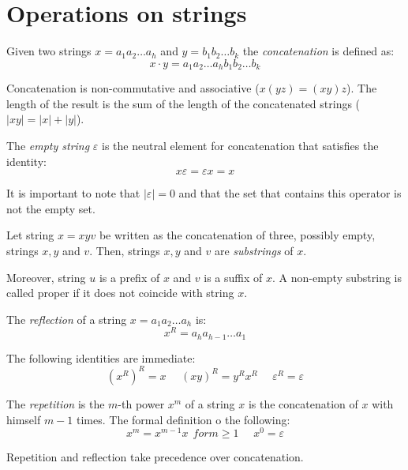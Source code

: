 \section{Operations on strings}

\begin{definition}[Concatenation]
    Given two strings $x=a_1a_2\dots a_h$ and $y=b_1b_2\dots b_k$ the \emph{concatenation} is defined as:
    \[x \cdot y = a_1a_2\dots a_h b_1b_2\dots b_k\]
\end{definition}
Concatenation is non-commutative and associative ($x(yz)=(xy)z$). The length of the result is the sum of the length of the concatenated strings
($\left\lvert xy \right\rvert = \left\lvert x \right\rvert + \left\lvert y \right\rvert$). 
\begin{definition}
    The \emph{empty string} $\varepsilon$ is the neutral element for concatenation that satisfies the identity:
    \[x\varepsilon=\varepsilon x=x\]
\end{definition}
It is important to note that $\left\lvert \varepsilon \right\rvert = 0$ and that the set that contains this operator is not the empty set. 
\begin{definition}[Substring]
    Let string $x=xyv$ be written as the concatenation of three, possibly empty, strings $x,y$ and $v$. Then, strings $x,y$ and $v$ are \emph{substrings} of $x$. 
\end{definition}
Moreover, string $u$ is a prefix of $x$ and $v$ is a suffix of $x$. A non-empty substring is called proper if it does not coincide with string $x$. 
\begin{definition}[Reflection]
    The \emph{reflection} of a string $x=a_1a_2\dots a_h$ is:
        \[x^R=a_ha_{h-1}\dots a_1\]
\end{definition}
The following identities are immediate: 
\[(x^R)^R=x \:\:\:\:\:\: (xy)^R=y^Rx^R \:\:\:\:\:\: \varepsilon^R=\varepsilon\]
\begin{definition}[Repetition]
    The \emph{repetition} is the $m$-th power $x^m$ of a string $x$ is the concatenation of $x$ with himself $m-1$ times. The formal definition o the following: 
    \[x^m=x^{m-1}x \:\: for m \geq 1 \:\:\:\:\:\: x^0=\varepsilon\]
\end{definition}
Repetition and reflection take precedence over concatenation. 